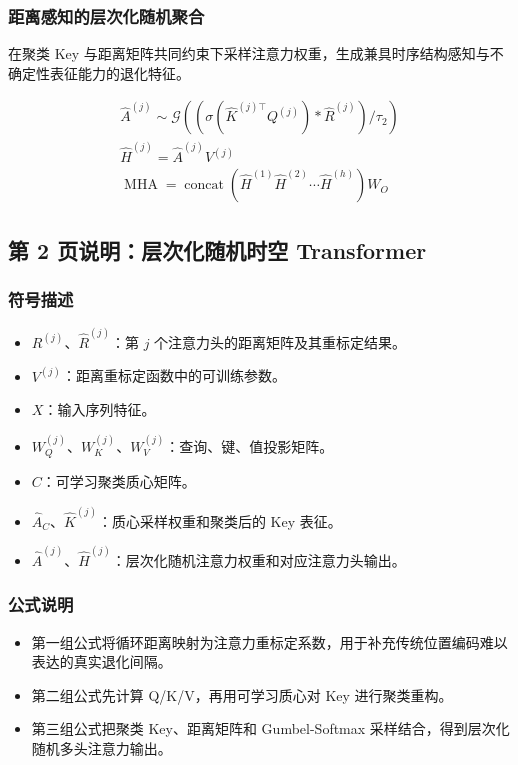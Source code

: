 ﻿\documentclass[UTF8,a4paper,10pt]{ctexart}
\begin{document}
\subsubsection*{距离感知的层次化随机聚合}
在聚类 Key 与距离矩阵共同约束下采样注意力权重，生成兼具时序结构感知与不确定性表征能力的退化特征。
\begin{formulabox}
\[\begin{gathered}
  \hat{A}^{(j)}
  \sim \mathcal{G}\left((\sigma(\hat{K}^{(j)\top}Q^{(j)}) * \hat{R}^{(j)})/\tau_2\right) \\
  \hat{H}^{(j)}
  = \hat{A}^{(j)}V^{(j)} \\
  \widehat{\operatorname{MHA}}
  = \operatorname{concat}\left(\hat{H}^{(1)}\hat{H}^{(2)}\cdots\hat{H}^{(h)}\right)W_O 
\end{gathered}\]
\end{formulabox}

\clearpage
\subsection*{第 2 页说明：层次化随机时空 Transformer}
\subsubsection*{符号描述}
\begin{itemize}
  \item $R^{(j)}$、$\hat R^{(j)}$：第 $j$ 个注意力头的距离矩阵及其重标定结果。
  \item $V^{(j)}$：距离重标定函数中的可训练参数。
  \item $X$：输入序列特征。
  \item $W_Q^{(j)}$、$W_K^{(j)}$、$W_V^{(j)}$：查询、键、值投影矩阵。
  \item $C$：可学习聚类质心矩阵。
  \item $\hat A_C$、$\hat K^{(j)}$：质心采样权重和聚类后的 Key 表征。
  \item $\hat A^{(j)}$、$\hat H^{(j)}$：层次化随机注意力权重和对应注意力头输出。
\end{itemize}
\subsubsection*{公式说明}
\begin{itemize}
  \item 第一组公式将循环距离映射为注意力重标定系数，用于补充传统位置编码难以表达的真实退化间隔。
  \item 第二组公式先计算 Q/K/V，再用可学习质心对 Key 进行聚类重构。
  \item 第三组公式把聚类 Key、距离矩阵和 Gumbel-Softmax 采样结合，得到层次化随机多头注意力输出。
\end{itemize}
\end{document}
